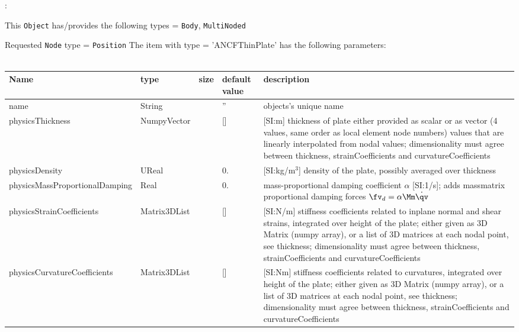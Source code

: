 \noindent {}:
\bi
  \item This \texttt{Object} has/provides the following types = \texttt{Body}, \texttt{MultiNoded}
  \item Requested \texttt{Node} type = \texttt{Position}
\ei\vspace{12pt} \noindent 
The item  with type = 'ANCFThinPlate' has the following parameters:
\vspace{-0.5cm}\\
\vspace{-0.5cm}\\
\begin{center}
  \footnotesize
  \begin{longtable}{| p{4.5cm} | p{2.5cm} | p{0.5cm} | p{2.5cm} | p{6cm} |}
    \hline
    \bf Name & \bf type & \bf size & \bf default value & \bf description \\ \hline
    name &     String &      &     '' &     objects's unique name\\ \hline
    physicsThickness &     NumpyVector &      &     [] &      [SI:m] thickness of plate either provided as scalar or as vector (4 values, same order as local element node numbers) values that are linearly interpolated from nodal values; dimensionality must agree between thickness, strainCoefficients and curvatureCoefficients\\ \hline
    physicsDensity &     UReal &      &     0. &      [SI:kg/m$^3$] density of the plate, possibly averaged over thickness\\ \hline
    physicsMassProportionalDamping &     Real &      &     0. &     mass-proportional damping coefficient $\alpha$ [SI:1/s]; adds massmatrix proportional damping forces $\fv_d = \alpha \Mm \dot{\qv}$\\ \hline
    physicsStrainCoefficients &     Matrix3DList &      &     [] &      [SI:N/m] stiffness coefficients related to inplane normal and shear strains, integrated over height of the plate; either given as 3D Matrix (numpy array), or a list of 3D matrices at each nodal point, see thickness; dimensionality must agree between thickness, strainCoefficients and curvatureCoefficients\\ \hline
    physicsCurvatureCoefficients &     Matrix3DList &      &     [] &      [SI:Nm] stiffness coefficients related to curvatures, integrated over height of the plate; either given as 3D Matrix (numpy array), or a list of 3D matrices at each nodal point, see thickness; dimensionality must agree between thickness, strainCoefficients and curvatureCoefficients\\ \hline

\end{longtable}
\end{center}
